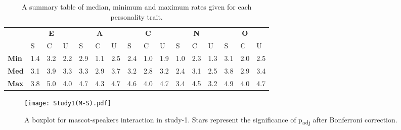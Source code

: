 \begin{table}[!htb]
    \renewcommand{\arraystretch}{1}
    \begin{center}
        \begin{tabular}{p{}|
        p{}|p{}|p{}||
        p{}|p{}|p{}||
        p{}|p{}|p{}||
        p{}|p{}|p{}||
        p{}|p{}|p{}|}
            \cline{2-16}
            & \multicolumn{3}{c||}{\textbf{E}} & \multicolumn{3}{c||}{\textbf{A}}
            & \multicolumn{3}{c||}{\textbf{C}} &  \multicolumn{3}{c||}{\textbf{N}} & \multicolumn{3}{c|}{\textbf{O}} \\
            \cline{2-16}
            & S & C & U & S & C & U & S & C & U & S & C & U & S & C & U            \\
            \cline{2-16}
            \textbf{Min}    & 1.4 & 3.2 & 2.2 & 2.9 & 1.1 & 2.5 & 2.4 & 1.0 & 1.9 & 1.0 & 2.3 & 1.3 & 3.1 & 2.0 & 2.5 \\
            \textbf{Med}    & 3.1 & 3.9 & 3.3 & 3.3 & 2.9 & 3.7 & 3.2 & 2.8 & 3.2 & 2.4 & 3.1 & 2.5 & 3.8 & 2.9 & 3.4\\
            \textbf{Max}    & 3.8 & 5.0 & 4.0 & 4.7 & 4.3 & 4.7 & 4.6 & 4.0 & 4.7 & 3.4 & 4.5 & 3.2 & 4.9 & 4.0 & 4.7\\
            \cline{2-16}
        \end{tabular}
        \caption[]{A summary table of median, minimum and maximum rates given for each personality trait.\footnotemark}
        \label{table:medianMS1}
    \end{center}
\end{table}
\begin{figure}[!htb]
    \centering
    \texttt{[image: Study1(M-S).pdf]}
    \caption[]{A boxplot for mascot-speakers interaction in study-1.
    Stars represent the significance of p\textsubscript{adj} after Bonferroni correction.\footnotemark}
    \label{fig:MS1}
\end{figure}

